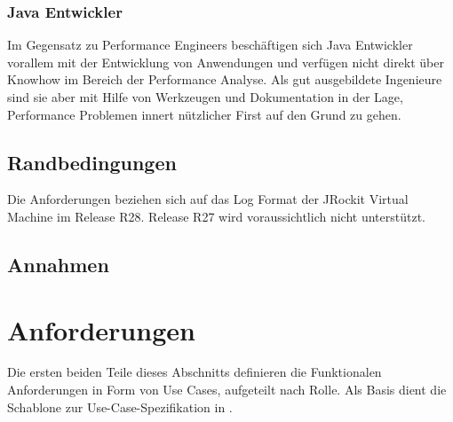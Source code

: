 \subsubsection{Java Entwickler}
Im Gegensatz zu Performance Engineers beschäftigen sich Java Entwickler vorallem mit der Entwicklung von Anwendungen und verfügen nicht direkt über Knowhow im Bereich der Performance Analyse. Als gut ausgebildete Ingenieure sind sie aber mit Hilfe von Werkzeugen und Dokumentation in der Lage, Performance Problemen innert nützlicher First auf den Grund zu gehen.

\subsection{Randbedingungen}\label{randbedingungen}
Die Anforderungen beziehen sich auf das Log Format der JRockit Virtual Machine im Release R28. Release R27 wird voraussichtlich nicht unterstützt.
\subsection{Annahmen}


\section{Anforderungen}
Die ersten beiden Teile dieses Abschnitts definieren die Funktionalen Anforderungen in Form von Use Cases, aufgeteilt nach Rolle. Als Basis dient die Schablone zur Use-Case-Spezifikation in \cite[S. 78-79]{pohl2010basiswissen}.





